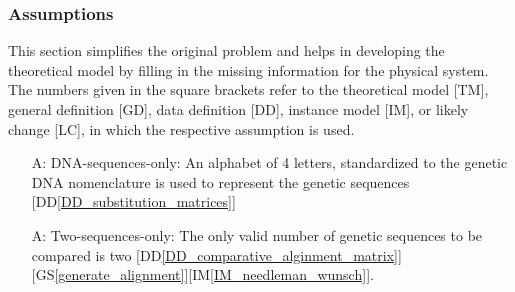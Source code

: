\documentclass[12pt]{article}
\newcounter{assumpnum} %
\begin{document}


\subsubsection{Assumptions} \label{sec_assumpt}


This section simplifies the original problem and helps in developing the
theoretical model by filling in the missing information for the physical system.
The numbers given in the square brackets refer to the theoretical model [TM],
general definition [GD], data definition [DD], instance model [IM], or likely
change [LC], in which the respective assumption is used.

\begin{itemize}

\item[A\refstepcounter{assumpnum}\theassumpnum \label{dna-sequences-only}:]
DNA-sequences-only: An alphabet of 4 letters, standardized to the genetic DNA nomenclature is used 
to represent the genetic sequences [DD\autoref{DD_substitution_matrices}]
\item[A\refstepcounter{assumpnum}\theassumpnum \label{two-sequences-only}:]
Two-sequences-only: The only valid number of genetic sequences to be compared is two [DD\autoref{DD_comparative_alginment_matrix}][GS\autoref{generate_alignment}][IM\autoref{IM_needleman_wunsch}].

\end{itemize}
\end{document}
